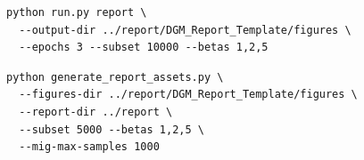 \begin{verbatim}
python run.py report \
  --output-dir ../report/DGM_Report_Template/figures \
  --epochs 3 --subset 10000 --betas 1,2,5
\end{verbatim}
\begin{verbatim}
python generate_report_assets.py \
  --figures-dir ../report/DGM_Report_Template/figures \
  --report-dir ../report \
  --subset 5000 --betas 1,2,5 \
  --mig-max-samples 1000
\end{verbatim}
